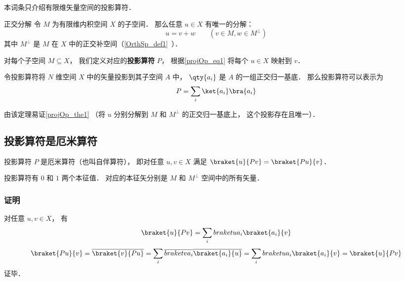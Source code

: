 

本词条只介绍有限维矢量空间的投影算符．

\begin{theorem}{正交分解}\label{projOp_the1}
令 $M$ 为有限维内积空间 $X$ 的子空间． 那么任意 $u\in X$ 有唯一的分解：
\begin{equation}\label{projOp_eq1}
u = v + w \qquad (v\in M, w\in M^\bot)
\end{equation}
其中 $M^\bot$ 是 $M$ 在 $X$ 中的正交补空间（\autoref{OrthSp_def1}~）．
\end{theorem}

对每个子空间 $M\subseteq X$， 我们定义对应的\textbf{投影算符} $P$， 根据\autoref{projOp_eq1} 将每个 $u\in X$ 映射到 $v$．

\begin{theorem}{}
令投影算符将 $N$ 维空间 $X$ 中的矢量投影到其子空间 $A$ 中， $\qty{a_i}$ 是 $A$ 的一组正交归一基底． 那么投影算符可以表示为
\begin{equation}
P = \sum_i \ket{a_i}\bra{a_i}
\end{equation}
\end{theorem}
由该定理易证\autoref{projOp_the1} （将 $u$ 分别分解到 $M$ 和 $M^\bot$ 的正交归一基底上， 这个投影存在且唯一）．



\subsection{投影算符是厄米算符}
投影算符 $P$ 是厄米算符（也叫自伴算符）， 即对任意 $u, v\in X$ 满足 $\braket{u}{Pv} = \braket{Pu}{v}$．

投影算符有 $0$ 和 $1$ 两个本征值． 对应的本征矢分别是 $M$ 和 $M^\bot$ 空间中的所有矢量．

\subsubsection{证明}
对任意 $u, v\in X$， 有
\begin{equation}
\braket{u}{Pv} = \sum_i \\braket{u}{a_i}\braket{a_i}{v}
\end{equation}
\begin{equation}
\braket{Pu}{v} = \overline {\braket{v}{Pu}} = \sum_i \overline{\\braket{v}{a_i}}\overline{\braket{a_i}{u}} = \sum_i \\braket{u}{a_i}\braket{a_i}{v} = \braket{u}{Pv}
\end{equation}
证毕．

